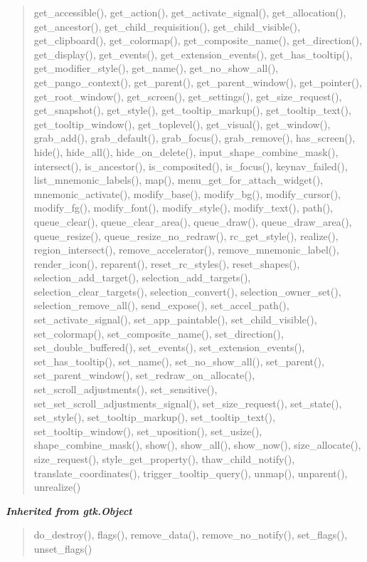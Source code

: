 \begin{quote}
get\_accessible(), get\_action(), get\_activate\_signal(), get\_allocation(), get\_ancestor(), get\_child\_requisition(), get\_child\_visible(), get\_clipboard(), get\_colormap(), get\_composite\_name(), get\_direction(), get\_display(), get\_events(), get\_extension\_events(), get\_has\_tooltip(), get\_modifier\_style(), get\_name(), get\_no\_show\_all(), get\_pango\_context(), get\_parent(), get\_parent\_window(), get\_pointer(), get\_root\_window(), get\_screen(), get\_settings(), get\_size\_request(), get\_snapshot(), get\_style(), get\_tooltip\_markup(), get\_tooltip\_text(), get\_tooltip\_window(), get\_toplevel(), get\_visual(), get\_window(), grab\_add(), grab\_default(), grab\_focus(), grab\_remove(), has\_screen(), hide(), hide\_all(), hide\_on\_delete(), input\_shape\_combine\_mask(), intersect(), is\_ancestor(), is\_composited(), is\_focus(), keynav\_failed(), list\_mnemonic\_labels(), map(), menu\_get\_for\_attach\_widget(), mnemonic\_activate(), modify\_base(), modify\_bg(), modify\_cursor(), modify\_fg(), modify\_font(), modify\_style(), modify\_text(), path(), queue\_clear(), queue\_clear\_area(), queue\_draw(), queue\_draw\_area(), queue\_resize(), queue\_resize\_no\_redraw(), rc\_get\_style(), realize(), region\_intersect(), remove\_accelerator(), remove\_mnemonic\_label(), render\_icon(), reparent(), reset\_rc\_styles(), reset\_shapes(), selection\_add\_target(), selection\_add\_targets(), selection\_clear\_targets(), selection\_convert(), selection\_owner\_set(), selection\_remove\_all(), send\_expose(), set\_accel\_path(), set\_activate\_signal(), set\_app\_paintable(), set\_child\_visible(), set\_colormap(), set\_composite\_name(), set\_direction(), set\_double\_buffered(), set\_events(), set\_extension\_events(), set\_has\_tooltip(), set\_name(), set\_no\_show\_all(), set\_parent(), set\_parent\_window(), set\_redraw\_on\_allocate(), set\_scroll\_adjustments(), set\_sensitive(), set\_set\_scroll\_adjustments\_signal(), set\_size\_request(), set\_state(), set\_style(), set\_tooltip\_markup(), set\_tooltip\_text(), set\_tooltip\_window(), set\_uposition(), set\_usize(), shape\_combine\_mask(), show(), show\_all(), show\_now(), size\_allocate(), size\_request(), style\_get\_property(), thaw\_child\_notify(), translate\_coordinates(), trigger\_tooltip\_query(), unmap(), unparent(), unrealize()
\end{quote}

\large{\textbf{\textit{Inherited from gtk.Object}}}

\begin{quote}
do\_destroy(), flags(), remove\_data(), remove\_no\_notify(), set\_flags(), unset\_flags()
\end{quote}

